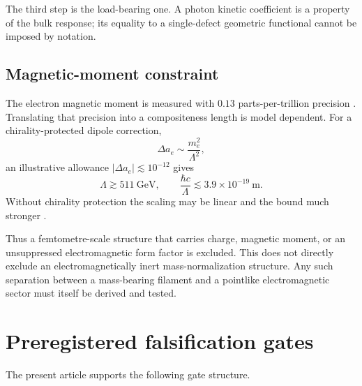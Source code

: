 \documentclass[aps,pre,preprint,notitlepage,nofootinbib,superscriptaddress]{revtex4-2}
\begin{document}
The third step is the load-bearing one.  A photon kinetic coefficient is a property of the bulk response; its equality to a single-defect geometric functional cannot be imposed by notation.

\subsection{Magnetic-moment constraint}

The electron magnetic moment is measured with \(0.13\) parts-per-trillion precision \cite{Fan2023}.  Translating that precision into a compositeness length is model dependent.  For a chirality-protected dipole correction,
\begin{equation}
  \Delta a_e
  \sim
  \frac{m_e^2}{\Lambda^2},
\end{equation}
an illustrative allowance \(|\Delta a_e|\lesssim10^{-12}\) gives
\begin{equation}
  \Lambda\gtrsim511\ \mathrm{GeV},
  \qquad
  \frac{\hbar c}{\Lambda}
  \lesssim3.9\times10^{-19}\ \mathrm m.
  \label{eq:gminus2-bound}
\end{equation}
Without chirality protection the scaling may be linear and the bound much stronger \cite{BrodskyDrell1980,GiudiceParadisiPassera2012}.

Thus a femtometre-scale structure that carries charge, magnetic moment, or an unsuppressed electromagnetic form factor is excluded.  This does not directly exclude an electromagnetically inert mass-normalization structure.  Any such separation between a mass-bearing filament and a pointlike electromagnetic sector must itself be derived and tested.

\section{Preregistered falsification gates}
\label{sec:programme}

The present article supports the following gate structure.
\end{document}
